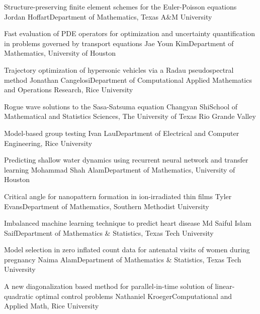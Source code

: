 \begin{postersPG}
\item\poster %
{Structure-preserving finite element schemes for the Euler-Poisson equations}
{Jordan Hoffart}{Department of Mathematics, Texas A\&M University}

\item\poster %
{Fast evaluation of PDE operators for optimization and uncertainty quantification in problems governed by transport equations}
{Jae Youn Kim}{Department of Mathematics, University of Houston}

\item\poster %
{Trajectory optimization of hypersonic vehicles via a Radau pseudospectral method}
{Jonathan Cangelosi}{Department of Computational Applied Mathematics and Operations Research, Rice University}

\item\poster %
{Rogue wave solutions to the Sasa-Satsuma equation}
{Changyan Shi}{School of Mathematical and Statistics Sciences, The University of Texas Rio Grande Valley}

\item\poster %
{Model-based group testing}
{Ivan Lau}{Department of Electrical and Computer Engineering, Rice University}

\item\poster %
{Predicting shallow water dynamics using recurrent neural network and transfer learning}
{Mohammad Shah Alam}{Department of Mathematics, University of Houston}

\item\poster %
{Critical angle for nanopattern formation in ion-irradiated thin films}
{Tyler Evans}{Department of Mathematics, Southern Methodist University}

\item\poster %
{Imbalanced machine learning technique to predict heart disease}
{Md Saiful Islam Saif}{Department of Mathematics \& Statistics, Texas Tech University}

\item\poster %
{Model selection in zero inflated count data for antenatal visits of women during pregnancy}
{Naima Alam}{Department of Mathematics \& Statistics, Texas Tech University}

\item\poster %
{A new diagonalization based method for parallel-in-time solution of linear-quadratic optimal control problems}
{Nathaniel Kroeger}{Computational and Applied Math, Rice University}


\end{postersPG}
